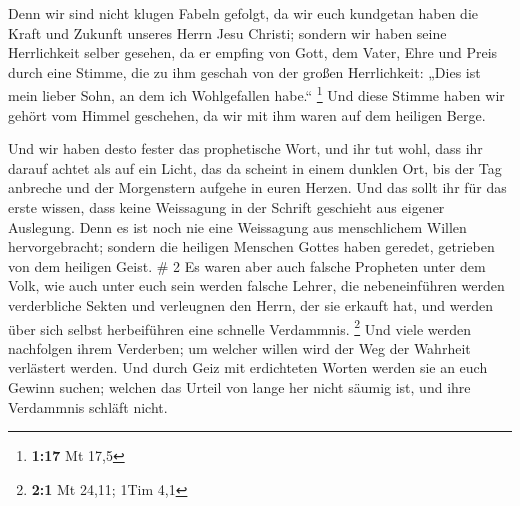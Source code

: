  Denn wir sind nicht klugen Fabeln gefolgt, da wir euch
kundgetan haben die Kraft und Zukunft unseres Herrn Jesu Christi;
sondern wir haben seine Herrlichkeit selber gesehen,  da
er empfing von Gott, dem Vater, Ehre und Preis durch eine Stimme, die zu
ihm geschah von der großen Herrlichkeit: „Dies ist mein lieber Sohn, an
dem ich Wohlgefallen habe.`` \footnote{\textbf{1:17} Mt 17,5}
 Und diese Stimme haben wir gehört vom Himmel geschehen,
da wir mit ihm waren auf dem heiligen Berge.

 Und wir haben desto fester das prophetische Wort, und
ihr tut wohl, dass ihr darauf achtet als auf ein Licht, das da scheint
in einem dunklen Ort, bis der Tag anbreche und der Morgenstern aufgehe
in euren Herzen.  Und das sollt ihr für das erste wissen,
dass keine Weissagung in der Schrift geschieht aus eigener Auslegung.
 Denn es ist noch nie eine Weissagung aus menschlichem
Willen hervorgebracht; sondern die heiligen Menschen Gottes haben
geredet, getrieben von dem heiligen Geist. \# 2  Es waren
aber auch falsche Propheten unter dem Volk, wie auch unter euch sein
werden falsche Lehrer, die nebeneinführen werden verderbliche Sekten und
verleugnen den Herrn, der sie erkauft hat, und werden über sich selbst
herbeiführen eine schnelle Verdammnis. \footnote{\textbf{2:1} Mt 24,11;
  1Tim 4,1}  Und viele werden nachfolgen ihrem Verderben;
um welcher willen wird der Weg der Wahrheit verlästert werden.
 Und durch Geiz mit erdichteten Worten werden sie an euch
Gewinn suchen; welchen das Urteil von lange her nicht säumig ist, und
ihre Verdammnis schläft nicht.

